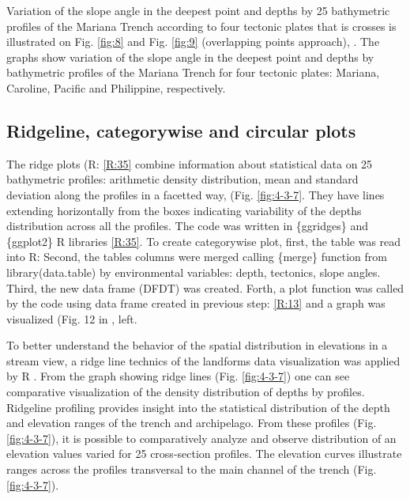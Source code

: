 \documentclass[11pt,a4paper]{report}
\begin{document}
{Variation of the slope angle in the deepest point and depths by 25 bathymetric profiles of the Mariana Trench according to four tectonic plates that is crosses is illustrated on Fig. \ref{fig:8} and Fig. \ref{fig:9} (overlapping points approach), \cite{Lemenkova201991}. The graphs show variation of the slope angle in the deepest point and depths by bathymetric profiles of the Mariana Trench for four tectonic plates: Mariana, Caroline, Pacific and Philippine, respectively.

\subsection{Ridgeline, categorywise and circular plots}\label{ssec:CW}
The ridge plots (R: \ref{R:35} combine information about statistical data on 25 bathymetric profiles: arithmetic density distribution, mean and standard deviation along the profiles in a facetted way, (Fig. \ref{fig:4-3-7}. They have lines extending horizontally from the boxes indicating variability of the depths distribution across all the profiles. The code was written in \{ggridges\} and \{ggplot2\} R libraries \ref{R:35}. To create categorywise plot, first, the table was read into R: Second, the tables columns were merged calling \{merge\} function from library(data.table) by environmental variables: depth, tectonics, slope angles. Third, the new data frame (DFDT) was created. Forth, a plot function was called by the code using data frame created in previous step: \ref{R:13} and a graph was visualized (Fig. 12 in \cite{Lemenkova201991}, left.

To better understand the behavior of the spatial distribution in elevations in a stream view, a ridge line technics of the landforms data visualization was applied by R \cite{RCoreTeam2014}. From the graph showing ridge lines (Fig. \ref{fig:4-3-7}) one can see comparative visualization of the density distribution of depths by profiles. Ridgeline profiling provides insight into the statistical distribution of the depth and elevation ranges of the trench and archipelago. From these profiles (Fig. \ref{fig:4-3-7}), it is possible to comparatively analyze and observe distribution of an elevation values varied for 25 cross-section profiles. The elevation curves illustrate ranges across the profiles transversal to the main channel of the trench (Fig. \ref{fig:4-3-7}).

}
\end{document}
